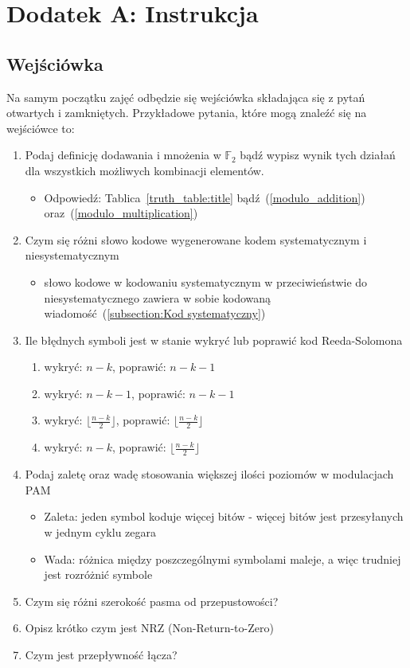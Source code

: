 \setcounter{secnumdepth}{0}
\section*{Dodatek A: Instrukcja}\label{zajecia-dydaktyczne}

\subsection{Wejściówka}

Na samym początku zajęć odbędzie się wejściówka składająca się z pytań otwartych
i zamkniętych.
Przykładowe pytania, które mogą znaleźć się na wejściówce to:

\begin{enumerate}
    \item Podaj definicję dodawania i mnożenia w $\mathbb{F}_2$ bądź wypisz wynik tych
    działań dla wszystkich możliwych kombinacji elementów.
    \begin{itemize}
        \item Odpowiedź: Tablica~\ref{truth_table:title} bądź~(\ref{modulo_addition})
        oraz~(\ref{modulo_multiplication})
    \end{itemize}
    \item Czym się różni słowo kodowe wygenerowane kodem systematycznym i niesystematycznym
    \begin{itemize}
        \item słowo kodowe w kodowaniu systematycznym w przeciwieństwie do niesystematycznego zawiera w sobie kodowaną wiadomość~(\ref{subsection:Kod systematyczny})
    \end{itemize}
    \item Ile błędnych symboli jest w stanie wykryć lub poprawić kod Reeda-Solomona
    \begin{enumerate}[label=\Alph*:]
        \item wykryć: $n-k$, poprawić: $n-k-1$
        \item wykryć: $n-k-1$, poprawić: $n-k-1$
        \item wykryć: $\lfloor \frac{n-k}{2} \rfloor$, poprawić: $\lfloor \frac{n-k}{2} \rfloor$
        \item wykryć: $n-k$, poprawić: $\lfloor \frac{n-k}{2} \rfloor$
    \end{enumerate}
    \item Podaj zaletę oraz wadę stosowania większej ilości poziomów w modulacjach PAM
    \begin{itemize}
        \item Zaleta: jeden symbol koduje więcej bitów - więcej bitów jest przesyłanych w jednym cyklu zegara
        \item Wada: różnica między poszczególnymi symbolami maleje, a więc trudniej jest rozróżnić symbole
    \end{itemize}
    \item Czym się różni szerokość pasma od przepustowości?
    \item Opisz krótko czym jest NRZ (Non-Return-to-Zero)
    \item Czym jest przepływność łącza?
\end{enumerate}

